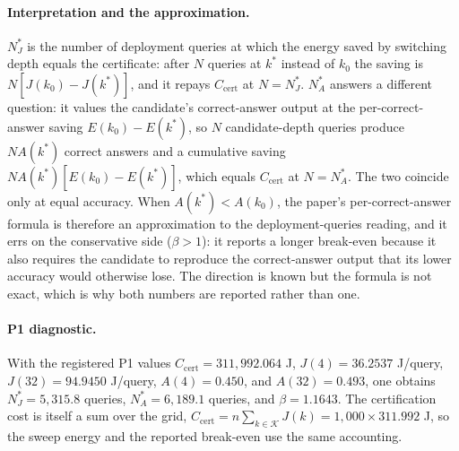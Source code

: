 \paragraph{Interpretation and the approximation.} $N^{*}_{J}$ is the number of
deployment queries at which the energy saved by switching depth equals the
certificate: after $N$ queries at $k^{*}$ instead of $k_{0}$ the saving is
$N\left[J(k_{0})-J(k^{*})\right]$, and it repays $C_{\mathrm{cert}}$ at
$N=N^{*}_{J}$. $N^{*}_{A}$ answers a different question: it values the candidate's
correct-answer output at the per-correct-answer saving $E(k_{0})-E(k^{*})$, so $N$
candidate-depth queries produce $N A(k^{*})$ correct answers and a cumulative
saving $N A(k^{*})\left[E(k_{0})-E(k^{*})\right]$, which equals
$C_{\mathrm{cert}}$ at $N=N^{*}_{A}$. The two coincide only at
equal accuracy. When $A(k^{*})<A(k_{0})$, the paper's per-correct-answer formula
is therefore an approximation to the deployment-queries reading, and it errs on
the conservative side ($\beta>1$): it reports a longer break-even because it also
requires the candidate to reproduce the correct-answer output that its lower
accuracy would otherwise lose. The direction is known but the formula is not
exact, which is why both numbers are reported rather than one.

\paragraph{P1 diagnostic.} With the registered P1 values
$C_{\mathrm{cert}}=311{,}992.064$ J, $J(4)=36.2537$ J/query,
$J(32)=94.9450$ J/query, $A(4)=0.450$, and $A(32)=0.493$, one obtains
$N^{*}_{J}=5{,}315.8$ queries, $N^{*}_{A}=6{,}189.1$ queries, and
$\beta=1.1643$. The certification cost is itself a sum over the grid,
$C_{\mathrm{cert}}=n\sum_{k\in\mathcal{K}}J(k)=1{,}000\times311.992$ J, so the
sweep energy and the reported break-even use the same accounting.

